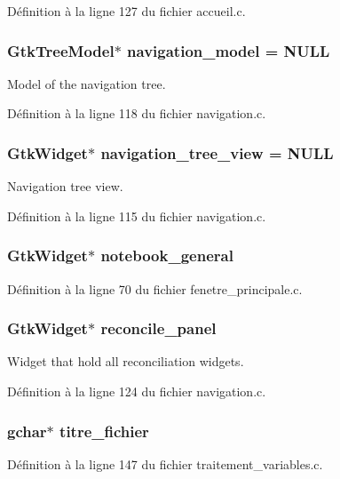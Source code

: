 Définition à la ligne 127 du fichier accueil.c.

\subsubsection[{navigation\_\-model}]{\setlength{\rightskip}{0pt plus 5cm}GtkTreeModel$\ast$ {\bf navigation\_\-model} = NULL}\label{navigation_8c_af25f8dd6dec7eb5cb22b4a710e686d29}
Model of the navigation tree. 

Définition à la ligne 118 du fichier navigation.c.

\subsubsection[{navigation\_\-tree\_\-view}]{\setlength{\rightskip}{0pt plus 5cm}GtkWidget$\ast$ {\bf navigation\_\-tree\_\-view} = NULL}\label{navigation_8c_a1cd17e8b2fd91a191f8d5d6a7e5f6979}
Navigation tree view. 

Définition à la ligne 115 du fichier navigation.c.

\subsubsection[{notebook\_\-general}]{\setlength{\rightskip}{0pt plus 5cm}GtkWidget$\ast$ {\bf notebook\_\-general}}\label{navigation_8c_a8924516aa4170f932308e93cf93a785b}


Définition à la ligne 70 du fichier fenetre\_\-principale.c.

\subsubsection[{reconcile\_\-panel}]{\setlength{\rightskip}{0pt plus 5cm}GtkWidget$\ast$ {\bf reconcile\_\-panel}}\label{navigation_8c_a0356c8380fe78fe23dc212255df45e4b}
Widget that hold all reconciliation widgets. 

Définition à la ligne 124 du fichier navigation.c.

\subsubsection[{titre\_\-fichier}]{\setlength{\rightskip}{0pt plus 5cm}gchar$\ast$ {\bf titre\_\-fichier}}\label{navigation_8c_a787cc81cf2ad728775b73d723713980b}


Définition à la ligne 147 du fichier traitement\_\-variables.c.

